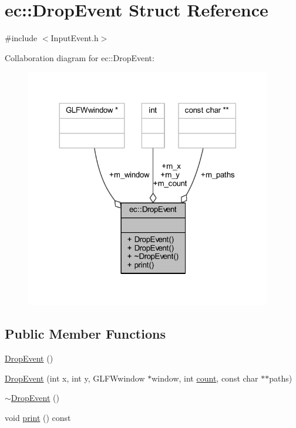 \hypertarget{structec_1_1_drop_event}{}\section{ec\+:\+:Drop\+Event Struct Reference}
\label{structec_1_1_drop_event}


{\ttfamily \#include $<$Input\+Event.\+h$>$}



Collaboration diagram for ec\+:\+:Drop\+Event\+:\nopagebreak
\begin{figure}[H]
\begin{center}
\leavevmode
\includegraphics[width=305pt]{structec_1_1_drop_event__coll__graph}
\end{center}
\end{figure}
\subsection*{Public Member Functions}
\begin{DoxyCompactItemize}
\item 
\mbox{\hyperlink{structec_1_1_drop_event_a6ae6f5be022c3809bc204c365dc11cbc}{Drop\+Event}} ()
\item 
\mbox{\hyperlink{structec_1_1_drop_event_a955d74612461f4100890101ddd1c2528}{Drop\+Event}} (int x, int y, G\+L\+F\+Wwindow $\ast$window, int \mbox{\hyperlink{namespaceec_a5de6bdb8c4b2ed6e590e721ec998f964ae2942a04780e223b215eb8b663cf5353}{count}}, const char $\ast$$\ast$paths)
\item 
\mbox{\hyperlink{structec_1_1_drop_event_ad68bca5b7ca0c65690fc85d682d057db}{$\sim$\+Drop\+Event}} ()
\item 
void \mbox{\hyperlink{structec_1_1_drop_event_a6cda7eaf944e0b94f49a8523c7da2656}{print}} () const
\end{DoxyCompactItemize}
